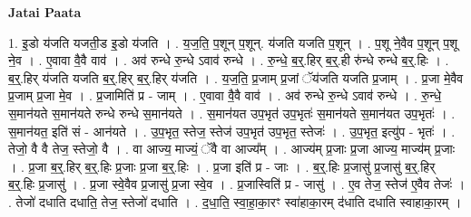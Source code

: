 \documentclass[17pt]{extarticle}
\begin{document}
\textbf{Jatai Paata} \newline

1. इ॒डो य॑जति यजती॒ड इ॒डो य॑जति । . य॒ज॒ति॒ प॒शून् प॒शून्. य॑जति यजति प॒शून् । . प॒शू ने॒वैव प॒शून् प॒शू ने॒व । . ए॒वावा वै॒वै वाव॑ । . अव॑ रुन्धे रु॒न्धे ऽवाव॑ रुन्धे । . रु॒न्धे॒ ब॒र्॒.हिर् ब॒र्॒.ही रु॑न्धे रुन्धे ब॒र्॒.हिः । . ब॒र्॒.हिर् य॑जति यजति ब॒र्॒.हिर् ब॒र्॒.हिर् य॑जति । . य॒ज॒ति॒ प्र॒जाम् प्र॒जां ॅय॑जति यजति प्र॒जाम् । . प्र॒जा मे॒वैव प्र॒जाम् प्र॒जा मे॒व । . प्र॒जामिति॑ प्र - जाम् । . ए॒वावा वै॒वै वाव॑ । . अव॑ रुन्धे रु॒न्धे ऽवाव॑ रुन्धे । . रु॒न्धे॒ स॒मान॑यते स॒मान॑यते रुन्धे रुन्धे स॒मान॑यते । . स॒मान॑यत उप॒भृत॑ उप॒भृतः॑ स॒मान॑यते स॒मान॑यत उप॒भृतः॑ । . स॒मान॑यत॒ इति॑ सं - आन॑यते । . उ॒प॒भृत॒ स्तेज॒ स्तेज॑ उप॒भृत॑ उप॒भृत॒ स्तेजः॑ । . उ॒प॒भृत॒ इत्यु॑प - भृतः॑ । . तेजो॒ वै वै तेज॒ स्तेजो॒ वै । . वा आज्य॒ माज्यं॒ ॅवै वा आज्य᳚म् । . आज्य॑म् प्र॒जाः प्र॒जा आज्य॒ माज्य॑म् प्र॒जाः । . प्र॒जा ब॒र्॒.हिर् ब॒र्॒.हिः प्र॒जाः प्र॒जा ब॒र्॒.हिः । . प्र॒जा इति॑ प्र - जाः । . ब॒र्॒.हिः प्र॒जासु॑ प्र॒जासु॑ ब॒र्॒.हिर् ब॒र्॒.हिः प्र॒जासु॑ । . प्र॒जा स्वे॒वैव प्र॒जासु॑ प्र॒जा स्वे॒व । . प्र॒जास्विति॑ प्र - जासु॑ । . ए॒व तेज॒ स्तेज॑ ए॒वैव तेजः॑ । . तेजो॑ दधाति दधाति॒ तेज॒ स्तेजो॑ दधाति । . द॒धा॒ति॒ स्वा॒हा॒का॒रꣳ स्वा॑हाका॒रम् द॑धाति दधाति स्वाहाका॒रम् । \newline
\end{document}
